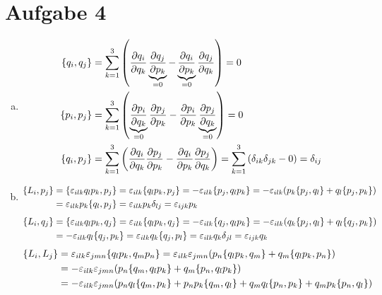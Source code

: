 \documentclass{article}
\theoremstyle{definition}
\begin{document}
\section*{Aufgabe 4}
\begin{enumerate}[(a)]
    \item \begin{align*}
        \qty{q_i, q_j} &= \sum_{k = 1}^{3} \qty(\pdv{q_i}{q_k} \underbrace{\pdv{q_j}{p_k}}_{=0} - \underbrace{\pdv{q_i}{p_k}}_{=0} \pdv{q_j}{q_k}) = 0\\
        \qty{p_i, p_j} &= \sum_{k = 1}^{3} \qty(\underbrace{\pdv{p_i}{q_k}}_{=0} \pdv{p_j}{p_k} - \pdv{p_i}{p_k} \underbrace{\pdv{p_j}{q_k}}_{=0}) = 0\\
        \qty{q_i, p_j} &= \sum_{k = 1}^{3} \qty(\pdv{q_i}{q_k} \pdv{p_j}{p_k} - \pdv{q_i}{p_k} \pdv{p_j}{q_k})=\sum_{k = 1}^{3} \qty(\delta_{ik} \delta_{jk} - 0) = \delta_{ij}\\ 
    \end{align*}
    \item \begin{align*}
        \qty{L_i, p_j} &= \qty{\varepsilon_{ilk} q_lp_k,p_j} = \varepsilon_{ilk} \qty{q_lp_k,p_j} = -\varepsilon_{ilk} \qty{p_j,q_lp_k} = -\varepsilon_{ilk} \qty(p_k\qty{p_j,q_l} + q_l\qty{p_j,p_k})\\
        &= \varepsilon_{ilk} p_k \qty{q_l,p_j} = \varepsilon_{ilk} p_k \delta_{lj} = \varepsilon_{ijk} p_k
    \end{align*}
    \begin{align*}
        \qty{L_i, q_j} &= \qty{\varepsilon_{ilk} q_lp_k,q_j} = \varepsilon_{ilk} \qty{q_lp_k,q_j} = -\varepsilon_{ilk} \qty{q_j,q_lp_k} = -\varepsilon_{ilk} \qty(q_k\qty{p_j,q_l} + q_l\qty{q_j,p_k})\\
        &= -\varepsilon_{ilk} q_l \qty{q_j,p_k} = \varepsilon_{ilk} q_k \qty{q_j,p_l} = \varepsilon_{ilk} q_k \delta_{jl} = \varepsilon_{ijk} q_k
    \end{align*}
    \begin{align*}
        \qty{L_i, L_j} &= \varepsilon_{ilk}\varepsilon_{jmn} \qty{q_lp_k, q_mp_n} = \varepsilon_{ilk}\varepsilon_{jmn} \qty(p_n\qty{q_lp_k, q_m} + q_m\qty{q_lp_k, p_n})\\
        &= -\varepsilon_{ilk}\varepsilon_{jmn} \qty(p_n\qty{q_m, q_lp_k} + q_m\qty{p_n, q_lp_k})\\
        &= -\varepsilon_{ilk}\varepsilon_{jmn} \qty(p_nq_l\qty{q_m, p_k} + p_np_k\qty{q_m, q_l}+ q_mq_l\qty{p_n, p_k} + q_mp_k\qty{p_n, q_l})\\

\end{align*}
\end{enumerate}
\end{document}
